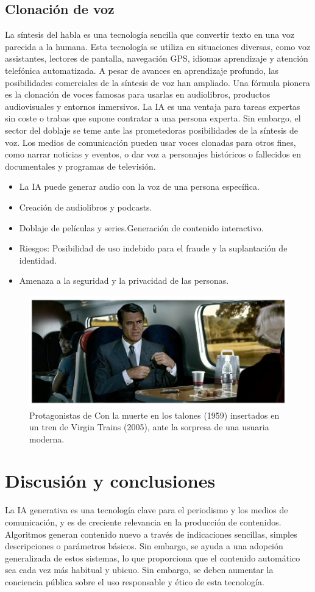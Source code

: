 \documentclass[12pt]{article}
\begin{document}
\subsection{Clonación de voz}
La síntesis del habla es una tecnología sencilla que convertir texto en una voz parecida a la humana. Esta tecnología se utiliza en situaciones diversas, como voz assistantes, lectores de pantalla, navegación GPS, idiomas aprendizaje y atención telefónica automatizada. A pesar de avances en aprendizaje profundo, las posibilidades comerciales de la síntesis de voz han ampliado. Una fórmula pionera es la clonación de voces famosas para usarlas en audiolibros, productos audiovisuales y entornos inmersivos. La IA es una ventaja para tareas expertas sin coste o trabas que supone contratar a una persona experta. Sin embargo, el sector del doblaje se teme ante las prometedoras posibilidades de la síntesis de voz. Los medios de comunicación pueden usar voces clonadas para otros fines, como narrar noticias y eventos, o dar voz a personajes históricos o fallecidos en documentales y programas de televisión.
\begin{itemize}
    \item La IA puede generar audio con la voz de una persona específica.
    \item Creación de audiolibros y podcasts.
    \item Doblaje de películas y series.Generación de contenido interactivo.
    \item Riesgos: Posibilidad de uso indebido para el fraude y la suplantación de identidad.
    \item Amenaza a la seguridad y la privacidad de las personas.
\end{itemize}

\begin{figure}
    \centering
    \includegraphics[width=0.5\linewidth]{WhatsApp Image 2024-09-18 at 20.47.33.jpeg}
    \caption{Protagonistas de Con la muerte en los talones (1959) insertados en un tren de Virgin Trains
(2005), ante la sorpresa de una usuaria moderna.}
    \label{fig:enter-label}
\end{figure}

\section{ Discusión y conclusiones}
La IA generativa es una tecnología clave para el periodismo y los medios de comunicación, y es de creciente relevancia en la producción de contenidos. Algoritmos generan contenido nuevo a través de indicaciones sencillas, simples descripciones o parámetros básicos. Sin embargo, se ayuda a una adopción generalizada de estos sistemas, lo que proporciona que el contenido automático sea cada vez más habitual y ubicuo. Sin embargo, se deben aumentar la conciencia pública sobre el uso responsable y ético de esta tecnología.
\end{document}
